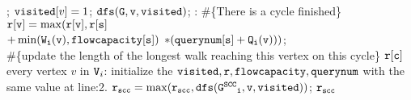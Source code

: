 \begin{algorithm}
\begin{algorithmic}[1]
 \STATE \qquad \qquad {}; 
 \STATE \qquad \qquad \qquad $\mathtt{visited}[v] = 1$; %
 \STATE \qquad \qquad \qquad $\mathtt{dfs(G, v, visited)}$;
 \STATE \qquad {}: \#\{There is a cycle finished\}
 \STATE \qquad \qquad \qquad $\mathtt{r[v] = \max(r[v], r[s]}$ 
 \\ \qquad \qquad \qquad \qquad \qquad
 $\mathtt{+ \min(\mathtt{W}_i(v), {flowcapacity}[s])}$ 
 $ \mathtt{* (querynum[s] + \mathtt{Q}_i(v)))}$; 
 \\
 \#\{update the length of the longest walk reaching this vertex on this cycle\}
 \STATE {} $\mathtt{r[c]}$
  every vertex $v$ in $\mathtt{V}_i$:
 \STATE \qquad initialize the $\mathtt{visited, r, flowcapacity, querynum}$ with the same value at line:2.
 \STATE \qquad $\mathtt{r_{scc} = \max(r_{scc}, dfs(\mathtt{G^{SCC}}_i, v, \mathtt{visited} ))}$; 
 \RETURN $\mathtt{r_{scc}}$
 \end{algorithmic}
 \end{algorithm}

